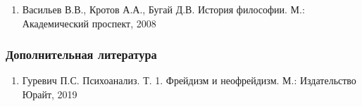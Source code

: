 \documentclass{article}
\begin{document}
\begin{enumerate}
    \item Васильев В.В., Кротов А.А., Бугай Д.В. История философии. М.: Академический проспект, 2008
\end{enumerate}

\subsubsection{Дополнительная литература}

\begin{enumerate}
    \item Гуревич П.С. Психоанализ. Т. 1. Фрейдизм и неофрейдизм. М.: Издательство Юрайт, 2019
\end{enumerate}
\end{document}
